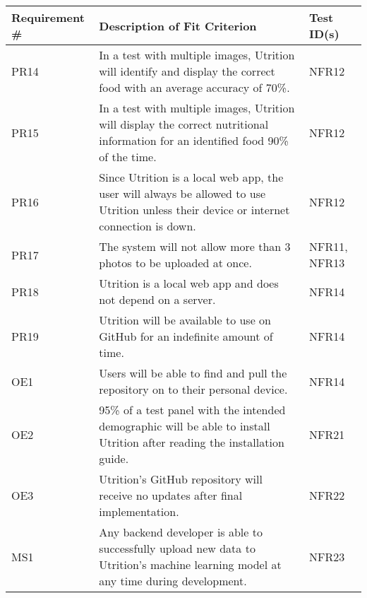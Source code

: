 \documentclass[12pt, titlepage]{article}
\begin{document}
	\begin{table}[H]
		\begin{tabularx}{\textwidth}{|l|X|l|}
			\hline
			{\bf Requirement \#} & {\bf Description of Fit Criterion} & {\bf Test ID(s)}\\
			\hline
			PR14 & In a test with multiple images, Utrition will identify and display the correct food with an average accuracy of 70\%. & NFR12\\
			\hline
			PR15 & In a test with multiple images, Utrition will display the correct nutritional information for an identified food 90\% of the time. & NFR12\\
			\hline
			PR16 & Since Utrition is a local web app, the user will always be allowed to use Utrition unless their device or internet connection is down. & NFR12\\
			\hline
			PR17 & The system will not allow more than 3 photos to be uploaded at once. & NFR11, NFR13\\
			\hline
			PR18 & Utrition is a local web app and does not depend on a server. & NFR14\\
			\hline
			PR19 & Utrition will be available to use on GitHub for an indefinite amount of time. & NFR14\\
			\hline
			OE1 & Users will be able to find and pull the repository on to their personal device. & NFR14\\
			\hline
			OE2 & 95\% of a test panel with the intended demographic will be able to install Utrition after reading the installation guide. & NFR21\\
			\hline
			OE3 & Utrition’s GitHub repository will receive no updates after final implementation. & NFR22\\
			\hline
			MS1 & Any backend developer is able to successfully upload new data to Utrition’s machine learning model at any time during development.  & NFR23\\
			\hline
		\end{tabularx}
	\end{table}
	
\end{document}
